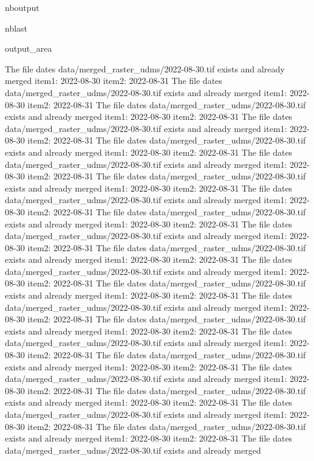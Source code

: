 \documentclass[letterpaper,10pt]{sphinxmanual}
\begin{document}
\begin{sphinxuseclass}{nboutput}
\begin{sphinxuseclass}{nblast}
{\begin{sphinxuseclass}{output_area}
\begin{sphinxuseclass}{}
\begin{sphinxVerbatim}[commandchars=\\\{\}]
The file dates data/merged\_raster\_udms/2022-08-30.tif exists and already merged
item1:  2022-08-30
item2:  2022-08-31
The file dates data/merged\_raster\_udms/2022-08-30.tif exists and already merged
item1:  2022-08-30
item2:  2022-08-31
The file dates data/merged\_raster\_udms/2022-08-30.tif exists and already merged
item1:  2022-08-30
item2:  2022-08-31
The file dates data/merged\_raster\_udms/2022-08-30.tif exists and already merged
item1:  2022-08-30
item2:  2022-08-31
The file dates data/merged\_raster\_udms/2022-08-30.tif exists and already merged
item1:  2022-08-30
item2:  2022-08-31
The file dates data/merged\_raster\_udms/2022-08-30.tif exists and already merged
item1:  2022-08-30
item2:  2022-08-31
The file dates data/merged\_raster\_udms/2022-08-30.tif exists and already merged
item1:  2022-08-30
item2:  2022-08-31
The file dates data/merged\_raster\_udms/2022-08-30.tif exists and already merged
item1:  2022-08-30
item2:  2022-08-31
The file dates data/merged\_raster\_udms/2022-08-30.tif exists and already merged
item1:  2022-08-30
item2:  2022-08-31
The file dates data/merged\_raster\_udms/2022-08-30.tif exists and already merged
item1:  2022-08-30
item2:  2022-08-31
The file dates data/merged\_raster\_udms/2022-08-30.tif exists and already merged
item1:  2022-08-30
item2:  2022-08-31
The file dates data/merged\_raster\_udms/2022-08-30.tif exists and already merged
item1:  2022-08-30
item2:  2022-08-31
The file dates data/merged\_raster\_udms/2022-08-30.tif exists and already merged
item1:  2022-08-30
item2:  2022-08-31
The file dates data/merged\_raster\_udms/2022-08-30.tif exists and already merged
item1:  2022-08-30
item2:  2022-08-31
The file dates data/merged\_raster\_udms/2022-08-30.tif exists and already merged
item1:  2022-08-30
item2:  2022-08-31
The file dates data/merged\_raster\_udms/2022-08-30.tif exists and already merged
item1:  2022-08-30
item2:  2022-08-31
The file dates data/merged\_raster\_udms/2022-08-30.tif exists and already merged
item1:  2022-08-30
item2:  2022-08-31
The file dates data/merged\_raster\_udms/2022-08-30.tif exists and already merged
item1:  2022-08-30
item2:  2022-08-31
The file dates data/merged\_raster\_udms/2022-08-30.tif exists and already merged
item1:  2022-08-30
item2:  2022-08-31
The file dates data/merged\_raster\_udms/2022-08-30.tif exists and already merged
item1:  2022-08-30
item2:  2022-08-31
The file dates data/merged\_raster\_udms/2022-08-30.tif exists and already merged
item1:  2022-08-30
item2:  2022-08-31
The file dates data/merged\_raster\_udms/2022-08-30.tif exists and already merged

\end{sphinxVerbatim}
\end{sphinxuseclass}
\end{sphinxuseclass}}
\end{sphinxuseclass}
\end{sphinxuseclass}
\end{document}
